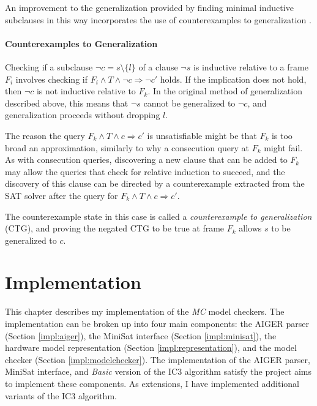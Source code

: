 \documentclass[12pt,a4paper,twoside,openright]{report}
\begin{document}
{%

An improvement to the generalization provided by finding minimal
inductive subclauses in this way incorporates the use of counterexamples
to generalization \cite{hassan13}.

\subsubsection{Counterexamples to Generalization}

Checking if a subclause $\neg c = s \setminus \{l\}$ of a clause $\neg s$ is inductive
relative to a frame $F_i$ involves checking if
$F_i \wedge T \wedge \neg c \Rightarrow \neg c'$ holds.
If the implication does not hold, then $\neg c$ is not inductive relative to
$F_k$. In the original method of generalization described above,
this means that $\neg s$ cannot be generalized to $\neg c$, and generalization
proceeds without dropping $l$.

The reason the query
$F_k \wedge T \wedge c \Rightarrow c'$ is unsatisfiable might be that
$F_k$ is too broad an approximation, similarly to why a consecution
query at $F_k$ might fail. As with consecution queries, discovering a
new clause that can be added to $F_k$ may allow the queries that
check for relative induction to succeed, and the discovery of this
clause can be directed by a counterexample extracted from the
SAT solver after the query for $F_k \wedge T \wedge c \Rightarrow c'$.

The counterexample state in this case is called a \emph{counterexample
to generalization} (CTG), and proving the negated CTG to be true at
frame $F_k$ allows $s$ to be generalized to $c$.


\chapter{Implementation}
\label{impl}

This chapter describes my implementation of the \emph{MC} model checkers.
The implementation can be broken up into four main components: the AIGER parser
(Section \ref{impl:aiger}), the
MiniSat interface (Section \ref{impl:minisat}), the hardware model representation
(Section \ref{impl:representation}), and the model checker
(Section \ref{impl:modelchecker}).
The implementation of the AIGER parser, MiniSat interface, and \emph{Basic} version
of the IC3 algorithm satisfy the project aims to implement these components. As
extensions, I have implemented additional variants of the IC3 algorithm.

}
\end{document}
